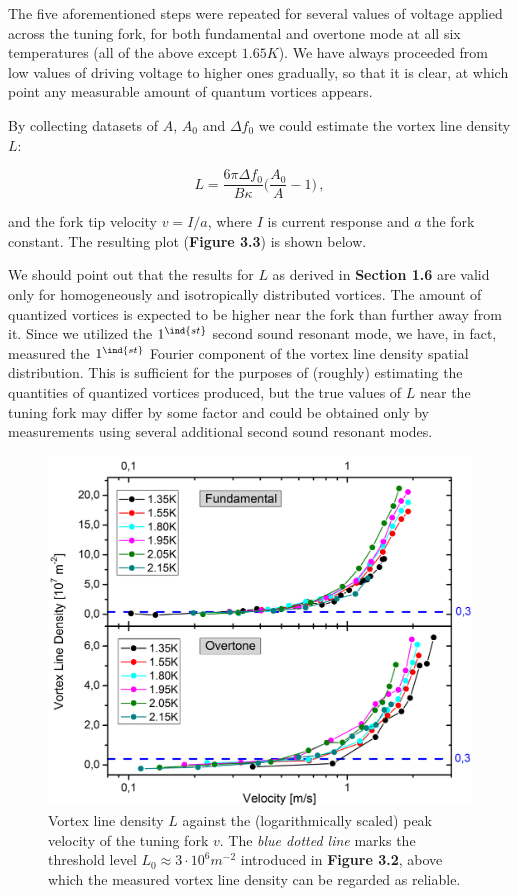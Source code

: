 The five aforementioned steps were repeated for several values of voltage applied across the tuning fork, for both fundamental and overtone mode at all six temperatures (all of the above except $ 1.65 \unit{K}$). We have always proceeded from low values of driving voltage to higher ones gradually, so that it is clear, at which point any measurable amount of quantum vortices appears.

By collecting datasets of $ A $, $ A_0 $ and $ \Delta f_0 $ we could estimate the vortex line density $ L $:

\begin{equation}
L = \frac{6\pi \Delta f_0}{B\kappa}\bigg( \frac{A_0}{A} - 1 \bigg)\,,
\label{eq}
\end{equation}

and the fork tip velocity $ v=I/a $, where $ I $ is current response and $ a $ the fork constant. The resulting plot ({\sffamily\textbf{Figure 3.3}}) is shown below.

We should point out that the results for $ L $ as derived in {\sffamily\textbf{Section 1.6}} are valid only for homogeneously and isotropically distributed vortices. The amount of quantized vortices is expected to be higher near the fork than further away from it. Since we utilized the $ 1^{\ind{st}} $ second sound resonant mode, we have, in fact, measured the $ 1^{\ind{st}} $ Fourier component of the vortex line density spatial distribution\cite{Emilfluids}. This is sufficient for the purposes of (roughly) estimating the quantities of quantized vortices produced, but the true values of $ L $ near the tuning fork may differ by some factor and could be obtained only by measurements using several additional second sound resonant modes.

\begin{figure}[h!]
	\centering
	\includegraphics[width=1\textwidth]{graphs/Merged_L_v(abs)}
	\caption{Vortex line density $ L $ against the (logarithmically scaled) peak velocity of the tuning fork $ v $. The \textit{blue dotted line} marks the threshold level $ L_0 \approx 3\cdot 10^6 \unit{m}^{-2} $ introduced in {\sffamily\textbf{Figure 3.2}}, above which the measured vortex line density can be regarded as reliable.}
\end{figure}



